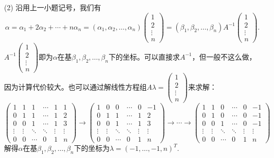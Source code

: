 (2) 沿用上一小题记号，我们有
$$\alpha = \alpha_1 + 2 \alpha_2 + \cdots + n \alpha_n = (\alpha_1, \alpha_2, \ldots, \alpha_n) \begin{pmatrix} 1 \\ 2 \\ \vdots \\ n \end{pmatrix} = (\beta_1, \beta_2, \ldots, \beta_n) A^{-1} \begin{pmatrix} 1 \\ 2 \\ \vdots \\ n \end{pmatrix}.$$
$A^{-1} \begin{pmatrix} 1 \\ 2 \\ \vdots \\ n \end{pmatrix}$即为$\alpha$在基$\beta_1, \beta_2, \ldots, \beta_n$下的坐标。可以直接求$A^{-1}$，但一般不这么做，因为计算代价较大。也可以通过解线性方程组$A \lambda = \begin{pmatrix} 1 \\ 2 \\ \vdots \\ n \end{pmatrix}$来求解：
$$\left( \begin{array}{ccccc|c}1 & 1 & 1 & \cdots & 1 & 1 \\ 0 & 1 & 1 & \cdots & 1 & 2 \\ 0 & 0 & 1 & \cdots & 1 & 3 \\ \vdots & \vdots & \ddots & \ddots & \vdots & \vdots \\ 0 & 0 & \cdots & 0 & 1 & n \end{array} \right) \rightarrow \left( \begin{array}{ccccc|c}1 & 0 & 0 & \cdots & 0 & -1 \\ 0 & 1 & 1 & \cdots & 1 & 2 \\ 0 & 0 & 1 & \cdots & 1 & 3 \\ \vdots & \vdots & \ddots & \ddots & \vdots & \vdots \\ 0 & 0 & \cdots & 0 & 1 & n \end{array} \right) \rightarrow \cdots \rightarrow \left( \begin{array}{ccccc|c}1 & 1 & 0 & \cdots & 0 & -1 \\ 0 & 1 & 0 & \cdots & 0 & -1 \\ 0 & 0 & 1 & \cdots & 0 & -1 \\ \vdots & \vdots & \ddots & \ddots & \vdots & \vdots \\ 0 & 0 & \cdots & 0 & 1 & n \end{array} \right)$$
解得$\alpha$在基$\beta_1, \beta_2, \ldots, \beta_n$下的坐标为$\lambda = (-1, \ldots, -1, n)^T.$

